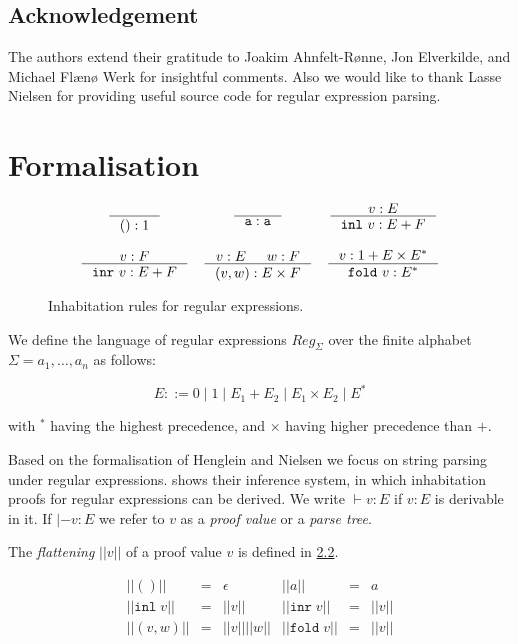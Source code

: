\documentclass[a4paper, oneside]{memoir}
\let\Fref\undefined
\theoremstyle{definition}
\begin{document}
\section{Acknowledgement}

The authors extend their gratitude to Joakim Ahnfelt-Rønne, Jon Elverkilde, and
Michael Flænø Werk for insightful comments. Also we would like to thank Lasse
Nielsen for providing useful source code for regular expression parsing.

\chapter{Formalisation}
\label{chap:formalisation}

\begin{figure}
\[
\begin{array}{ccc}
  \inference{}{() : 1}
&
  \inference{}{\texttt{a} : \texttt{a}}
&
  \inference{v : E}{\mathtt{inl}\ v : E + F}
\\
\\
  \inference{v : F}{\mathtt{inr}\ v : E + F}
&
  \inference{v : E & w : F}{(v, w) : E \times F}
&
  \inference{v : 1 + E \times E^{\ast}}{\mathtt{fold}\ v : E^{\ast}}
\end{array}
\]
\caption{Inhabitation rules for regular expressions.}
\label{fig:inhabitation}
\end{figure}

We define the language of regular expressions $Reg_\Sigma$ over the finite
alphabet $\Sigma = {a_1, \dots, a_n}$ as follows:

\[
    E ::= 0 \; | \; 1 \; | \; E_1 + E_2 \; | \; E_1 \times E_2 \; | \; E^{*}
\]

\noindent with ${}^{\ast}$ having the highest precedence, and $\times$ having
higher precedence than $+$.

Based on the formalisation of Henglein and Nielsen \cite{heni2010} we focus on
string parsing under regular expressions. \Fref{fig:inhabitation}
shows their inference system, in which inhabitation proofs for regular
expressions can be derived. We write $\vdash v : E$ if $v : E$ is derivable in
it. If $|- v : E$ we refer to $v$ as a \emph{proof value} or a \emph{parse tree}.

The \emph{flattening} $||v||$ of a proof value $v$ is defined in \ref{fig:flatten}.

\begin{figure}
\[
\begin{array}{rclrcl}
||()|| & = & \epsilon &
||a||  & = & a \\
|| \mathtt{inl} \; v|| & = & ||v|| &
|| \mathtt{inr} \; v|| & = & ||v|| \\
|| (v,w)|| & = & ||v||||w|| &
|| \mathtt{fold} \; v|| & = & ||v||
\end{array}
\]
\label{fig:flatten}
\end{figure}
\end{document}
